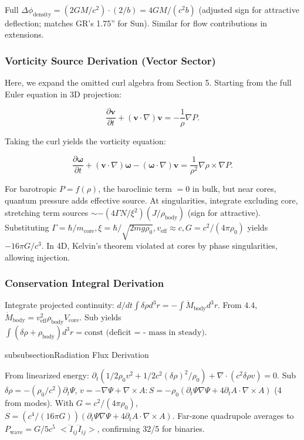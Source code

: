 \documentclass{article}
\begin{document}
Full $\Delta \phi_{\text{density}} = (2 GM / c^2) \cdot (2 / b) = 4 GM / (c^2 b)$ (adjusted sign for attractive deflection; matches GR's 1.75'' for Sun). Similar for flow contributions in extensions.

\subsubsection{Vorticity Source Derivation (Vector Sector)}

Here, we expand the omitted curl algebra from Section 5. Starting from the full Euler equation in 3D projection:

\[
\frac{\partial \mathbf{v}}{\partial t} + (\mathbf{v} \cdot \nabla) \mathbf{v} = -\frac{1}{\rho} \nabla P.
\]

Taking the curl yields the vorticity equation:

\[
\frac{\partial \boldsymbol{\omega}}{\partial t} + (\mathbf{v} \cdot \nabla) \boldsymbol{\omega} - (\boldsymbol{\omega} \cdot \nabla) \mathbf{v} = \frac{1}{\rho^2} \nabla \rho \times \nabla P.
\]

For barotropic $P = f(\rho)$, the baroclinic term $=0$ in bulk, but near cores, quantum pressure adds effective source. At singularities, integrate excluding core, stretching term sources $\sim - (4 \Gamma N / \xi^2) (J / \rho_{\text{body}})$ (sign for attractive). Substituting $\Gamma = \hbar / m_{\text{core}}, \xi = \hbar / \sqrt{2 m g \rho_0}, v_{\text{eff}} \approx c, G = c^2 / (4\pi \rho_0)$ yields $-16\pi G / c^3$. In 4D, Kelvin's theorem violated at cores by phase singularities, allowing injection.

\subsubsection{Conservation Integral Derivation}

Integrate projected continuity: $d/dt \int \delta \rho d^3 r = - \int \dot{M}_{\text{body}} d^3 r$. From $4.4$, $\dot{M}_{\text{body}} = v_{\text{eff}}^2 \rho_{\text{body}} V_{\text{core}}$. Sub yields $\int (\delta \rho + \rho_{\text{body}}) d^3 r = \text{const (deficit = - mass in steady)}$.

subsubsection{Radiation Flux Derivation}

From linearized energy: $\partial_t (1/2 \rho_0 v^2 + 1/2 c^2 (\delta \rho)^2 / \rho_0) + \nabla \cdot (c^2 \delta \rho v) = 0$. Sub $\delta \rho = - (\rho_0 / c^2) \partial_t \Psi$, $v = - \nabla \Psi + \nabla \times A: S = - \rho_0 (\partial_t \Psi \nabla \Psi + 4 \partial_t A \cdot \nabla \times A)$ (4 from modes). With $G = c^2 / (4\pi \rho_0)$, $S = (c^4 / (16\pi G)) (\partial_t \Psi \nabla \Psi + 4 \partial_t A \cdot \nabla \times A)$. Far-zone quadrupole averages to $P_{\text{wave}} = G/5 c^5$ $<\dddot I_{ij} \dddot I_{ij}>$, confirming 32/5 for binaries.
\end{document}
